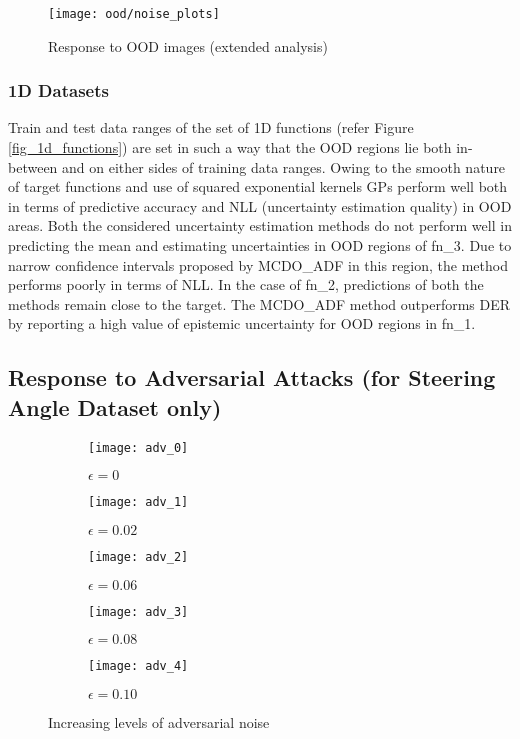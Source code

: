 \begin{figure}[H]
	\centering
	\texttt{[image: ood/noise\_plots]}
	\caption{Response to OOD images (extended analysis) }
	\label{fig_ood_extended}
	\hfill
\end{figure}
\subsubsection{1D Datasets}
Train and test data ranges of the set of 1D functions (refer Figure \ref{fig_1d_functions}) are set in such a way that the OOD regions lie both in-between and on either sides of training data ranges. Owing to the smooth nature of target functions and use of squared exponential kernels GPs perform well both in terms of predictive accuracy and NLL (uncertainty estimation quality) in OOD areas. Both the considered uncertainty estimation methods do not perform well in predicting the mean and estimating uncertainties in OOD regions of fn\_3. Due to narrow confidence intervals proposed by MCDO\_ADF in this region, the method performs poorly in terms of NLL. In the case of fn\_2, predictions of both the methods remain close to the target. The MCDO\_ADF method outperforms DER by reporting a high value of epistemic uncertainty for OOD regions in fn\_1. 
\subsection{Response to Adversarial Attacks (for Steering Angle Dataset only)}\label{subsec_adv}
\begin{figure}[H]
	\centering
	\begin{subfigure}[b]{0.19\textwidth}
		\centering
		\texttt{[image: adv\_0]}
		\caption{$\epsilon=0$}
		\label{fig:y equals x}
	\end{subfigure}
	\hfill
	\begin{subfigure}[b]{0.19\textwidth}
		\centering
		\texttt{[image: adv\_1]}
		\caption{$\epsilon=0.02$}
		\label{fig:three sin x}
	\end{subfigure}
	\hfill
	\begin{subfigure}[b]{0.19\textwidth}
		\centering
		\texttt{[image: adv\_2]}
		\caption{$\epsilon=0.06$}
		\label{fig:five over x}
	\end{subfigure}
	\hfill
	\begin{subfigure}[b]{0.19\textwidth}
		\centering
		\texttt{[image: adv\_3]}
		\caption{$\epsilon=0.08$}
		\label{fig:five over x}
	\end{subfigure}
	\hfill
	\begin{subfigure}[b]{0.19\textwidth}
		\centering
		\texttt{[image: adv\_4]}
		\caption{$\epsilon=0.10$}
		\label{fig:five over x}
	\end{subfigure}
	\caption{Increasing levels of adversarial noise}
	\label{fig_adv_example}
\end{figure}

